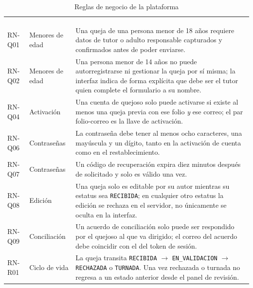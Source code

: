 	\begin{longtable}{|L{1.8cm}|L{2.7cm}|L{11.1cm}|}
		\hiderowcolors\caption{Reglas de negocio de la plataforma}
		\label{tab:reglas_negocio} \\ \showrowcolors
		\hline
		 &  &  \\
		\hline
		\endfirsthead
	
		\hline
		 &  &  \\
		\hline
		\endhead
	
		RN-Q01 & Menores de edad & Una queja de una persona menor de 18 años requiere datos de tutor
		o adulto responsable capturados y confirmados antes de poder enviarse. \\ \hline
	
		RN-Q02 & Menores de edad & Una persona menor de 14 años no puede autorregistrarse ni
		gestionar la queja por sí misma; la interfaz indica de forma explícita que debe ser el tutor
		quien complete el formulario a su nombre. \\ \hline
	
	
		RN-Q04 & Activación & Una cuenta de quejoso solo puede activarse si existe al menos una queja
		previa con ese folio \emph{y} ese correo; el par folio-correo es la llave de activación.
		\\ \hline
	
	
		RN-Q06 & Contraseñas & La contraseña debe tener al menos ocho caracteres, una mayúscula y un
		dígito, tanto en la activación de cuenta como en el restablecimiento. \\ \hline
	
		RN-Q07 & Contraseñas & Un código de recuperación expira diez minutos después de solicitado y
		solo es válido una vez. \\ \hline
	
		RN-Q08 & Edición & Una queja solo es editable por su autor mientras su estatus sea
		\texttt{RECIBIDA}; en cualquier otro estatus la edición se rechaza en el servidor, no
		únicamente se oculta en la interfaz. \\ \hline
	
		RN-Q09 & Conciliación & Un acuerdo de conciliación solo puede ser respondido por el quejoso
		al que va dirigido; el correo del acuerdo debe coincidir con el del token de sesión.
		\\ \hline
	
	
		RN-R01 & Ciclo de vida & La queja transita \texttt{RECIBIDA} $\rightarrow$
		\texttt{EN\_VALIDACION} $\rightarrow$ \texttt{RECHAZADA} o \texttt{TURNADA}. Una vez
		rechazada o turnada no regresa a un estado anterior desde el panel de revisión. \\ \hline
	

\end{longtable}
